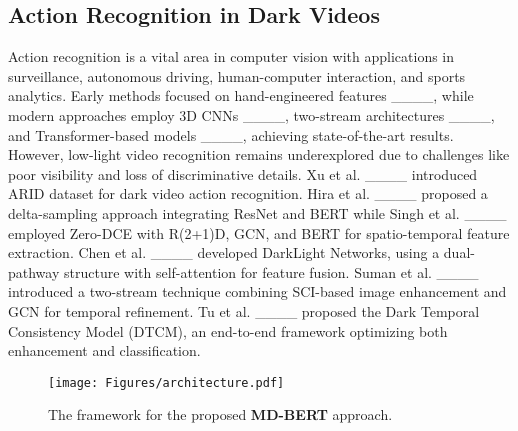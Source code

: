 
\subsection{Action Recognition in Dark Videos}



Action recognition is a vital area in computer vision with applications in surveillance, autonomous driving, human-computer interaction, and sports analytics. Early methods focused on hand-engineered features ____, while modern approaches employ 3D CNNs ____, two-stream architectures ____, and Transformer-based models ____, achieving state-of-the-art results. However, low-light video recognition remains underexplored due to challenges like poor visibility and loss of discriminative details. Xu et al. ____ introduced ARID dataset for dark video action recognition. Hira et al. ____ proposed a delta-sampling approach integrating ResNet and BERT while Singh et al. ____  employed Zero-DCE with R(2+1)D, GCN, and BERT for spatio-temporal feature extraction. Chen et al. ____ developed DarkLight Networks, using a dual-pathway structure with self-attention for feature fusion. Suman et al. ____ introduced a two-stream technique combining SCI-based image enhancement and GCN for temporal refinement. Tu et al. ____ proposed the Dark Temporal Consistency Model (DTCM), an end-to-end framework optimizing both enhancement and classification. 



\begin{figure*}[ht]
    \centering
    \texttt{[image: Figures/architecture.pdf]}
    \caption{The framework for the proposed \textbf{MD-BERT} approach.}
    \label{fig:arc-figure}
\end{figure*}
